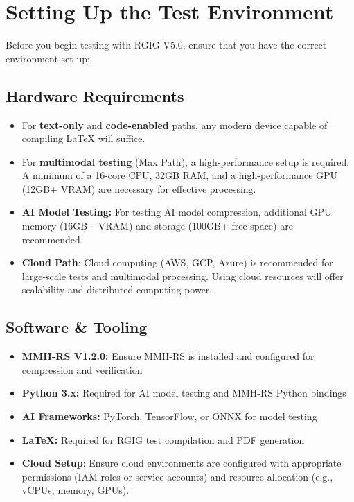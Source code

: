 \section*{Setting Up the Test Environment}
Before you begin testing with RGIG V5.0, ensure that you have the correct environment set up:

\subsection*{Hardware Requirements}
\begin{itemize}
  \item For \textbf{text-only} and \textbf{code-enabled} paths, any modern device capable of compiling \LaTeX{} will suffice.
  \item For \textbf{multimodal testing} (Max Path), a high-performance setup is required. A minimum of a 16-core CPU, 32GB RAM, and a high-performance GPU (12GB+ VRAM) are necessary for effective processing.
  \item \textbf{AI Model Testing:} For testing AI model compression, additional GPU memory (16GB+ VRAM) and storage (100GB+ free space) are recommended.
  \item \textbf{Cloud Path}: Cloud computing (AWS, GCP, Azure) is recommended for large-scale tests and multimodal processing. Using cloud resources will offer scalability and distributed computing power.
\end{itemize}

\subsection*{Software \& Tooling}
\begin{itemize}
  \item \textbf{MMH-RS V1.2.0:} Ensure MMH-RS is installed and configured for compression and verification
  \item \textbf{Python 3.x:} Required for AI model testing and MMH-RS Python bindings
  \item \textbf{AI Frameworks:} PyTorch, TensorFlow, or ONNX for model testing
  \item \textbf{LaTeX:} Required for RGIG test compilation and PDF generation
  \item \textbf{Cloud Setup}: Ensure cloud environments are configured with appropriate permissions (IAM roles or service accounts) and resource allocation (e.g., vCPUs, memory, GPUs).
\end{itemize}

